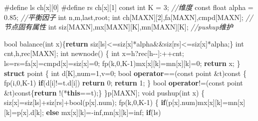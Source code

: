 \documentclass[
]{article}
\newenvironment{Shaded}{}{}
\newcommand{\AttributeTok}[1]{\textcolor[rgb]{0.49,0.56,0.16}{#1}}
\newcommand{\CommentTok}[1]{\textcolor[rgb]{0.38,0.63,0.69}{\textit{#1}}}
\newcommand{\ControlFlowTok}[1]{\textcolor[rgb]{0.00,0.44,0.13}{\textbf{#1}}}
\newcommand{\DataTypeTok}[1]{\textcolor[rgb]{0.56,0.13,0.00}{#1}}
\newcommand{\DecValTok}[1]{\textcolor[rgb]{0.25,0.63,0.44}{#1}}
\newcommand{\FloatTok}[1]{\textcolor[rgb]{0.25,0.63,0.44}{#1}}
\newcommand{\KeywordTok}[1]{\textcolor[rgb]{0.00,0.44,0.13}{\textbf{#1}}}
\newcommand{\NormalTok}[1]{#1}
\newcommand{\PreprocessorTok}[1]{\textcolor[rgb]{0.74,0.48,0.00}{#1}}
\begin{document}
\begin{Shaded}
\begin{Highlighting}[]
\PreprocessorTok{\#define ls }\NormalTok{ch[x][}\DecValTok{0}\NormalTok{]}
\PreprocessorTok{\#define rs }\NormalTok{ch[x][}\DecValTok{1}\NormalTok{]}
\AttributeTok{const} \DataTypeTok{int}\NormalTok{ K = }\DecValTok{3}\NormalTok{; }\CommentTok{//维度}
\AttributeTok{const} \DataTypeTok{float}\NormalTok{ alpha = }\FloatTok{0.85}\NormalTok{; }\CommentTok{//平衡因子}
\DataTypeTok{int}\NormalTok{ n,m,last,root;}
\DataTypeTok{int}\NormalTok{ ch[MAXN][}\DecValTok{2}\NormalTok{],fa[MAXN],cmpd[MAXN]; }\CommentTok{//节点固有属性}
\DataTypeTok{int}\NormalTok{ siz[MAXN],mx[MAXN][K],mn[MAXN][K]; }\CommentTok{//pushup维护}

\DataTypeTok{bool}\NormalTok{ balance(}\DataTypeTok{int}\NormalTok{ x)\{}\ControlFlowTok{return}\NormalTok{ siz[ls]\textless{}=siz[x]*alpha\&\&siz[rs]\textless{}=siz[x]*alpha;\}}
\DataTypeTok{int}\NormalTok{ cnt,h,rec[MAXN];}
\DataTypeTok{int}\NormalTok{ newnode()}
\NormalTok{\{}
    \DataTypeTok{int}\NormalTok{ x=h?rec[h{-}{-}]:++cnt;}
\NormalTok{    ls=rs=fa[x]=cmpd[x]=siz[x]=}\DecValTok{0}\NormalTok{;}
\NormalTok{    fp(k,}\DecValTok{0}\NormalTok{,K{-}}\DecValTok{1}\NormalTok{)mx[x][k]=mn[x][k]=}\DecValTok{0}\NormalTok{;}
    \ControlFlowTok{return}\NormalTok{ x;}
\NormalTok{\}}
\KeywordTok{struct}\NormalTok{ point}
\NormalTok{\{}
    \DataTypeTok{int}\NormalTok{ d[K],num=}\DecValTok{1}\NormalTok{,v=}\DecValTok{0}\NormalTok{;}
    \DataTypeTok{bool} \KeywordTok{operator}\NormalTok{==(}\AttributeTok{const}\NormalTok{ point \&t)}\AttributeTok{const}
\NormalTok{    \{}
\NormalTok{        fp(i,}\DecValTok{0}\NormalTok{,K{-}}\DecValTok{1}\NormalTok{)}
            \ControlFlowTok{if}\NormalTok{(d[i]!=t.d[i])}
                \ControlFlowTok{return} \DecValTok{0}\NormalTok{;}
        \ControlFlowTok{return} \DecValTok{1}\NormalTok{;}
\NormalTok{    \}}
    \DataTypeTok{bool} \KeywordTok{operator}\NormalTok{!=(}\AttributeTok{const}\NormalTok{ point \&t)}\AttributeTok{const}\NormalTok{\{}\ControlFlowTok{return}\NormalTok{ !(*}\KeywordTok{this}\NormalTok{==t);\}}
\NormalTok{\}p[MAXN];}
\DataTypeTok{void}\NormalTok{ pushup(}\DataTypeTok{int}\NormalTok{ x)}
\NormalTok{\{}
\NormalTok{    siz[x]=siz[ls]+siz[rs]+}\DataTypeTok{bool}\NormalTok{(p[x].num);}
\NormalTok{    fp(k,}\DecValTok{0}\NormalTok{,K{-}}\DecValTok{1}\NormalTok{)}
\NormalTok{    \{}
        \ControlFlowTok{if}\NormalTok{(p[x].num)mx[x][k]=mn[x][k]=p[x].d[k];}
        \ControlFlowTok{else}\NormalTok{ mx[x][k]={-}inf,mn[x][k]=inf;}
        \ControlFlowTok{if}\NormalTok{(ls)}

\end{Highlighting}
\end{Shaded}
\end{document}
